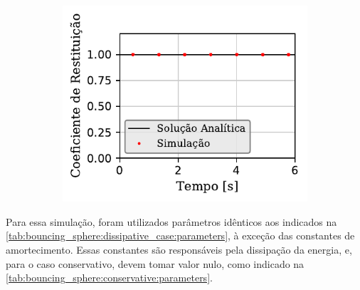 \begin{figure}[htb!]
{\begin{subfigure}[t]{\smallresultsfigwidth}
			\caption{}
			\label{subfig:bouncing_sphere:conservative:mechanical_energy}
		\end{subfigure}
		\begin{subfigure}[t]{\smallresultsfigwidth}
			\centering
			\includegraphics[scale=1]{images/bouncing_sphere/conservative/small_coefficient_of_restitution.pdf}
			\caption{}
			\label{subfig:bouncing_sphere:conservative:coefficient_of_restitution}
		\end{subfigure}
	}
	\sourceMe
	\label{fig:bouncing_sphere:conservative}
\end{figure}

Para essa simulação, foram utilizados parâmetros idênticos aos indicados na \cref{tab:bouncing_sphere:dissipative_case:parameters}, à exceção das constantes de amortecimento. Essas constantes são responsáveis pela dissipação da energia, e, para o caso conservativo, devem tomar valor nulo, como indicado na \cref{tab:bouncing_sphere:conservative:parameters}.

